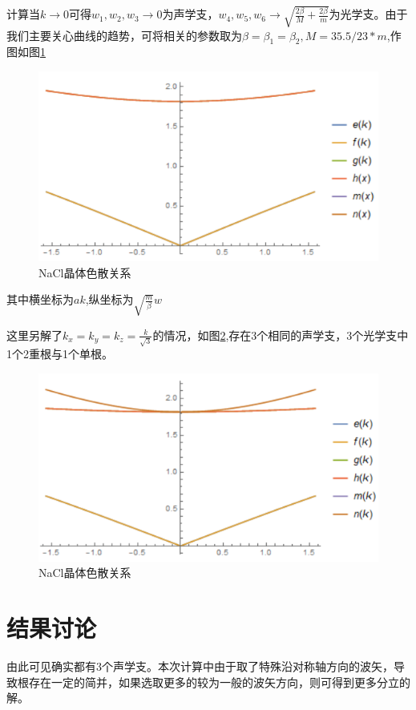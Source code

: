 \documentclass{article}
\begin{document}
计算当$ k\rightarrow 0 $可得$ w_1,w_2,w_3\rightarrow0 $为声学支，$ w_4,w_5,w_6\rightarrow \sqrt{\frac{2\beta}{M}+\frac{2\beta}{m}} $为光学支。由于我们主要关心曲线的趋势，可将相关的参数取为$\beta =\beta_1 = \beta_2,M=35.5/23*m $,作图如图\ref{fig:2}
	\begin{figure}[!h]
	
	\centering
	\includegraphics[scale=0.85]{mode}
	\caption{\heiti{}NaCl晶体色散关系}
	\label{fig:2}%
\end{figure}
其中横坐标为$ ak $,纵坐标为$ \sqrt{\frac{m}{\beta}}w $


这里另解了$ k_x=k_y=k_z=\frac{k}{\sqrt{3}}$的情况，如图\ref{fig:3},存在3个相同的声学支，3个光学支中1个2重根与1个单根。
	\begin{figure}[!h]
	
	\centering
	\includegraphics[scale=0.9]{mode_2}
	\caption{\heiti{}NaCl晶体色散关系}
	\label{fig:3}%
\end{figure}
\section{结果讨论}
由此可见确实都有3个声学支。本次计算中由于取了特殊沿对称轴方向的波矢，导致根存在一定的简并，如果选取更多的较为一般的波矢方向，则可得到更多分立的解。
\end{document}

